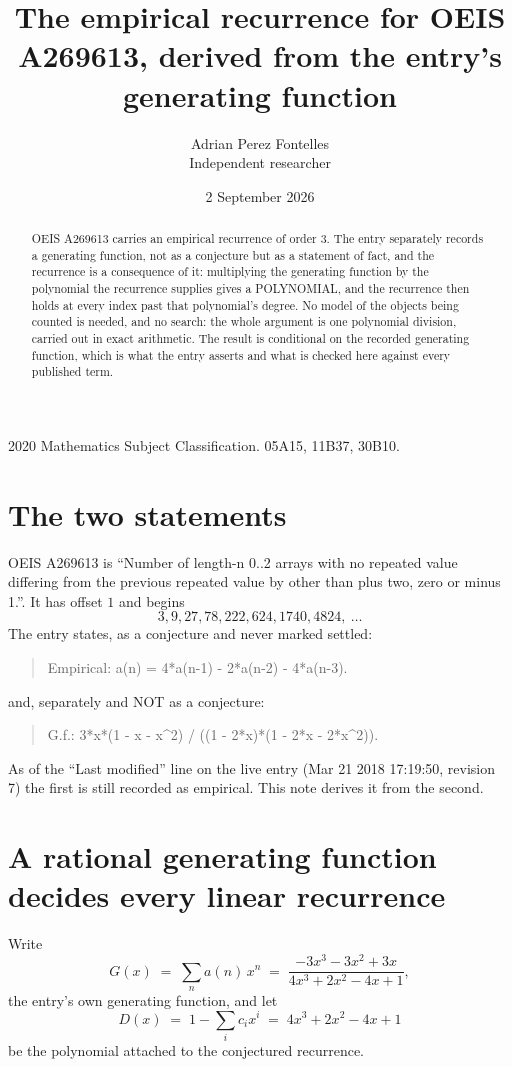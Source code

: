 \documentclass[11pt,a4paper]{article}
\title{The empirical recurrence for OEIS A269613, derived from the entry's generating function}
\author{Adrian Perez Fontelles\\ \small Independent researcher}
\date{2 September 2026}
\theoremstyle{plain}
\theoremstyle{definition}
\begin{document}
\maketitle

\begin{abstract}
OEIS A269613 carries an empirical recurrence of order $3$. The entry separately records a
generating function, not as a conjecture but as a statement of fact, and the recurrence is a
consequence of it: multiplying the generating function by the polynomial the recurrence
supplies gives a POLYNOMIAL, and the recurrence then holds at every index past that
polynomial's degree. No model of the objects being counted is needed, and no search: the
whole argument is one polynomial division, carried out in exact arithmetic. The result is
conditional on the recorded generating function, which is what the entry asserts and what is
checked here against every published term.
\end{abstract}

\noindent\small 2020 Mathematics Subject Classification. 05A15, 11B37, 30B10.\normalsize

\section{The two statements}

OEIS A269613 is ``Number of length-n 0..2 arrays with no repeated value differing from the previous repeated value by other than plus two, zero or minus 1.''. It has offset $1$ and begins
\[
3, 9, 27, 78, 222, 624, 1740, 4824,\ \dots
\]
The entry states, as a conjecture and never marked settled:
\begin{quote}
Empirical: a(n) = 4*a(n-1) - 2*a(n-2) - 4*a(n-3).
\end{quote}
and, separately and NOT as a conjecture:
\begin{quote}
G.f.: 3*x*(1 - x - x\^{}2) / ((1 - 2*x)*(1 - 2*x - 2*x\^{}2)).
\end{quote}
As of the ``Last modified'' line on the live entry (Mar 21 2018 17:19:50, revision 7) the first is still
recorded as empirical. This note derives it from the second.

\section{A rational generating function decides every linear recurrence}

Write
\[
G(x)\;=\;\sum_{n}a(n)\,x^{n}\;=\;\frac{- 3 x^{3} - 3 x^{2} + 3 x}{4 x^{3} + 2 x^{2} - 4 x + 1},
\]
the entry's own generating function, and let
\[
D(x)\;=\;1-\sum_i c_i x^{i}\;=\;4 x^{3} + 2 x^{2} - 4 x + 1
\]
be the polynomial attached to the conjectured recurrence.
\end{document}
